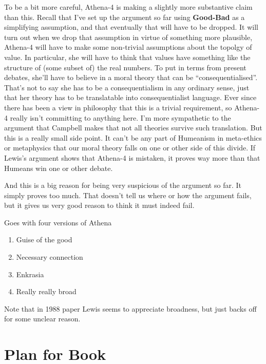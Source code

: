 \documentclass[11pt,]{book}
\providecommand{\tightlist}{%
  \setlength{\itemsep}{0pt}\setlength{\parskip}{0pt}}
\begin{document}
To be a bit more careful, Athena-4 is making a slightly more substantive claim than this. Recall that I've set up the argument so far using \textbf{Good-Bad} as a simplifying assumption, and that eventually that will have to be dropped. It will turn out when we drop that assumption in virtue of something more plausible, Athena-4 will have to make some non-trivial assumptions about the topolgy of value. In particular, she will have to think that values have something like the structure of (some subset of) the real numbers. To put in terms from present debates, she'll have to believe in a moral theory that can be ``consequentialised''. That's not to say she has to be a consequentialism in any ordinary sense, just that her theory has to be translatable into consequentialist language. Ever since \citet{Moore1903} there has been a view in philosophy that this is a trivial requirement, so Athena-4 really isn't committing to anything here. I'm more sympathetic to the argument that Campbell \citet{Brown2011-BROCT} makes that not all theories survive such translation. But this is a really small side point. It can't be any part of Humeanism in meta-ethics or metaphysics that our moral theory falls on one or other side of this divide. If Lewis's argument shows that Athena-4 is mistaken, it proves way more than that Humeans win one or other debate.

And this is a big reason for being very suspicious of the argument so far. It simply proves too much. That doesn't tell us where or how the argument fails, but it gives us very good reason to think it must indeed fail.

Goes with four versions of Athena

\begin{enumerate}
\def\labelenumi{\arabic{enumi}.}
\tightlist
\item
  Guise of the good
\item
  Necessary connection
\item
  Enkrasia
\item
  Really really broad
\end{enumerate}

Note that in 1988 paper Lewis seems to appreciate broadness, but just backs off for some unclear reason.

\hypertarget{plan-for-book}{%
\section{Plan for Book}\label{plan-for-book}}
\end{document}
